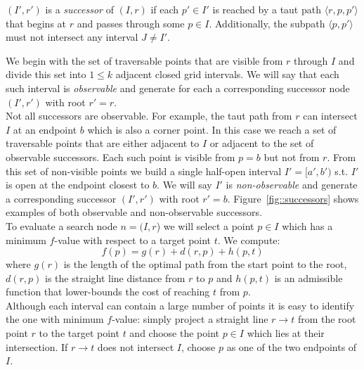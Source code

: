 \begin{defi}
\label{defi::successors}
$(I', r')$ is a \emph{successor} of
$(I, r)$ if each $p' \in I'$ is reached
by a taut path $\langle r, p,  p' \rangle$ that begins
at $r$ and passes through some $p \in I$.  Additionally, 
the subpath $\langle p, p' \rangle$ must not intersect any 
interval $J \neq I'$.
\end{defi}
We begin with the set of traversable points that are 
visible from $r$ through $I$ and divide this set into $1 \leq k$
adjacent closed grid intervals.
We will say that each such interval is \emph{observable} and 
generate for each a corresponding successor node 
$(I', r')$ with root $r' = r$.
\\
Not all successors are observable.
For example, the taut path from $r$ can intersect 
$I$ at an endpoint $b$ which is also a corner point.
In this case we reach a set of traversable points that 
are either adjacent to $I$ or adjacent to the set of 
observable successors.
Each such point is visible from $p = b$ but not 
from $r$.  From this set of non-visible points we build a 
single half-open interval $I' = [a', b')$ s.t. $I'$ is open at the 
endpoint closest to $b$.
We will say $I'$ is \emph{non-observable} and generate a 
corresponding successor $(I', r')$ with root $r' = b$.  
Figure~\ref{fig::successors} shows examples of both
observable and non-observable successors.
%
\\
To evaluate a search node $n = (I, r$) we will select a point $p \in I$ 
which has a minimum $f$-value with respect to a target point $t$.
We compute: 
\begin{equation}
\label{eq::f}
f(p) = g(r) + d(r, p) + h(p, t)
\end{equation}
where $g(r)$ is the length of the optimal path from the start point to 
the root, $d(r, p)$ is the straight line distance from $r$ to $p$
and $h(p, t)$ is an admissible function that lower-bounds the cost of
reaching $t$ from $p$.
\\
Although each interval can contain a large number of points it is easy to
identify the one with minimum $f$-value: simply project a straight line $r
\rightarrow t$ from the root point $r$ to the target point $t$ and choose the
point $p \in I$ which lies at their intersection.  If $r \rightarrow t$ does not
intersect $I$, choose $p$ as one of the two endpoints of $I$.

